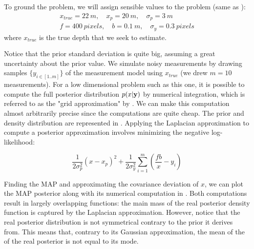 To ground the problem, we will assign sensible values to the problem (same as \cite{barfoot2017state}):
%
\begin{gather*}
    x_{true} = 22~m, \quad x_p = 20~m, \quad \sigma_p = 3~m \\
    f = 400~pixels, \quad b = 0.1~m, \quad \sigma_y = 0.3~pixels   
\end{gather*}
%
where $x_{true}$ is the true depth that we seek to estimate.

Notice that the prior standard deviation is quite big, assuming a great uncertainty about the prior value. We simulate noisy measurements by drawing samples 
$\{y_{i \in [1..m]}\}$ of the measurement model using $x_{true}$ (we drew $m=10$ measurements). For a low dimensional problem such as this one, 
it is possible to compute the full posterior distribution $p(x|{\bf y})$ by numerical integration, which is referred to as the "grid approximation" by 
\cite{mcelreath2018statistical}. We can make this computation almost arbitrarily precise since the computations are quite cheap. The prior and density distribution are represented in . 
Applying the Laplacian approximation to compute a posterior approximation involves minimizing the negative log-likelihood:

\begin{equation}
    \frac{1}{2 \sigma_p^2}(x - x_p)^2 + \frac{1}{2\sigma_y^2} \sum_{i=1}^m (\frac{fb}{x} - y_i)
\end{equation}

Finding the MAP and approximating the covariance deviation of $x$, we can plot the MAP posterior along with its numerical computation in . 
Both computations result in largely overlapping functions: the main mass of the real posterior density function is captured by the Laplacian approximation.
However, notice that the real posterior distribution is not symmetrical contrary to the prior it derives from. This means that, contrary to its Gaussian approximation, the mean of the
of the real posterior is not equal to its mode. 

